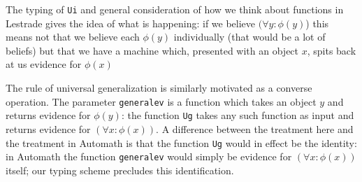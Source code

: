 \documentclass{slides}
\begin{document}
\begin{slide}
The typing of {\tt Ui} and general consideration of
how we think about functions in Lestrade gives
the idea of what is happening: if we believe
$(\forall y:\phi(y)$) this means not that we believe each
$\phi(y)$ individually (that would be a lot of beliefs)
but that we have a machine which, presented
with an object $x$, spits back at us evidence for
$\phi(x)$

The rule of universal generalization is similarly
motivated as a converse operation. The parameter {\tt  generalev} is a function which takes an
object $y$ and returns evidence for $\phi(y)$: the
function {\tt  Ug} takes any such function as input
and returns evidence for $(\forall x:\phi(x))$.
A difference between the treatment here and
the treatment in Automath is that the function {\tt Ug} would in effect be the identity: in Automath the function {\tt generalev} would simply be
evidence for $(\forall x:\phi(x))$ itself; our typing scheme
precludes this identification.

\end{slide}
\end{document}
